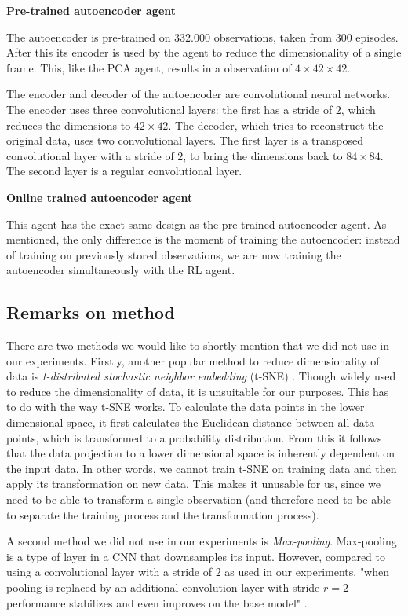 \noindent \textbf{Pre-trained autoencoder agent}\par
\noindent The autoencoder is pre-trained on $332.000$ observations, taken from $300$ episodes. After this its encoder is used by the agent to reduce the dimensionality of a single frame. This, like the PCA agent, results in a observation of $4 \times 42 \times 42$.

The encoder and decoder of the autoencoder are convolutional neural networks. The encoder uses three convolutional layers: the first has a stride of $2$, which reduces the dimensions to $42 \times 42$. The decoder, which tries to reconstruct the original data, uses two convolutional layers. The first layer is a transposed convolutional layer with a stride of $2$, to bring the dimensions back to $84 \times 84$. The second layer is a regular convolutional layer. \par
 
\noindent \textbf{Online trained autoencoder agent}\par
\noindent  This agent has the exact same design as the pre-trained autoencoder agent. As mentioned, the only difference is the moment of training the autoencoder: instead of training on previously stored observations, we are now training the autoencoder simultaneously with the RL agent.

\subsection{Remarks on method}
There are two methods we would like to shortly mention that we did not use in our experiments. Firstly, another popular method to reduce dimensionality of data is \emph{t-distributed stochastic neighbor embedding} (t-SNE) \cite{tsne}. Though widely used to reduce the dimensionality of data, it is unsuitable for our purposes. This has to do with the way t-SNE works. To calculate the data points in the lower dimensional space, it first calculates the Euclidean distance between all data points, which is transformed to a probability distribution. From this it follows that the data projection to a lower dimensional space is inherently dependent on the input data. In other words, we cannot train t-SNE on training data and then apply its transformation on new data. This makes it unusable for us, since we need to be able to transform a single observation (and therefore need to be able to separate the training process and the transformation process). 

A second method we did not use in our experiments is \emph{Max-pooling}. Max-pooling is a type of layer in a CNN that downsamples its input. However, compared to using a convolutional layer with a stride of $2$ as used in our experiments, "when pooling is replaced by an additional convolution layer with stride $r = 2$ performance stabilizes and even improves on the base model" \cite{maxvsconv}.
 


